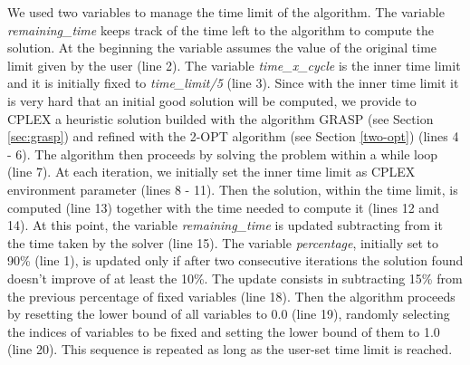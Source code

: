 We used two variables to manage the time limit of the algorithm. The variable \textit{remaining\_time} keeps track of the time left to the algorithm to compute the solution. At the beginning the variable assumes the value of the original time limit given by the user (line 2). The variable \textit{time\_x\_cycle} is the inner time limit and it is initially fixed to \textit{time\_limit/5} (line 3). Since with the inner time limit it is very hard that an initial good solution will be computed, we provide to CPLEX a heuristic solution builded with the algorithm GRASP (see Section \ref{sec:grasp}) and refined with the 2-OPT algorithm (see Section \ref{two-opt}) (lines 4 - 6).
The algorithm then proceeds by solving the problem within a while loop (line 7). At each iteration, we initially set the inner time limit as CPLEX environment parameter (lines 8 - 11). 
Then the solution, within the time limit, is computed (line 13) together with the time needed to compute it (lines 12 and 14).
At this point, the variable \textit{remaining\_time} is updated subtracting from it the time taken by the solver (line 15).
 The variable \textit{percentage}, initially set to 90\% (line 1), is updated only if after two consecutive iterations the solution found doesn't improve of at least the 10\%. The update consists in subtracting 15\% from the previous percentage of fixed variables (line 18). Then the algorithm proceeds by resetting the lower bound of all variables to 0.0 (line 19), randomly selecting the indices of variables to be fixed and setting the lower bound of them to 1.0 (line 20). This sequence is repeated as long as the user-set time limit is reached.

